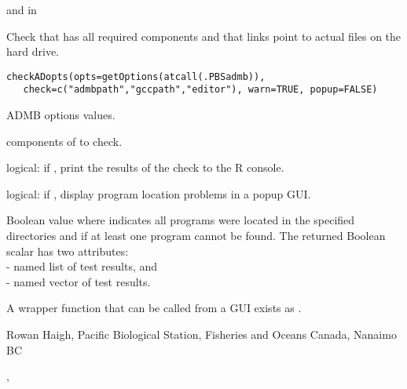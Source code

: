\documentclass[letterpaper]{book}
\begin{document}
%
\begin{SeeAlso}\relax
{} and  in 
\end{SeeAlso}
%
\begin{Description}\relax
Check that  has all required components and
that links point to actual files on the hard drive.
\end{Description}
%
\begin{Usage}
\begin{verbatim}
checkADopts(opts=getOptions(atcall(.PBSadmb)),
   check=c("admbpath","gccpath","editor"), warn=TRUE, popup=FALSE)
\end{verbatim}
\end{Usage}
%
\begin{Arguments}
\begin{ldescription}
\item[\code{opts}] ADMB options values.
\item[\code{check}] components of  to check.
\item[\code{warn}] logical: if , print the results of the check to the R console.
\item[\code{popup}] logical: if , display program location problems in a popup GUI.
\end{ldescription}
\end{Arguments}
%
\begin{Value}
Boolean value where  indicates all programs were located in the 
specified directories and  if at least one program cannot be found.
The returned Boolean scalar has two attributes: \\{}
 - named list of test results, and \\{}
 - named vector of test results.
\end{Value}
%
\begin{Note}\relax
A wrapper function that can be called from a GUI exists as .
\end{Note}
%
\begin{Author}\relax
 Rowan Haigh, Pacific Biological Station, Fisheries and Oceans Canada, Nanaimo BC 
\end{Author}
%
\begin{SeeAlso}\relax
 , 
\end{SeeAlso}
\end{document}
